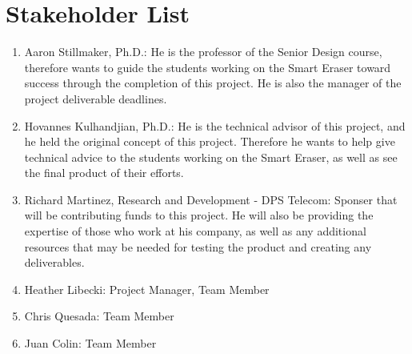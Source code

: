  \section{Stakeholder List}
 \begin{enumerate}
 	\item	Aaron Stillmaker, Ph.D.: He is the professor of the Senior Design course, therefore wants to guide the students working on the Smart Eraser toward success through the completion of this project. He is also the manager of the project deliverable deadlines.\\ 
 	\item   Hovannes Kulhandjian, Ph.D.: He is the technical advisor of this project, and he held the original concept of this project. Therefore he wants to help give technical advice to the students working on the Smart Eraser, as well as see the final product of their efforts.\\
 	\item	Richard Martinez, Research and Development - DPS Telecom: Sponser that will be contributing funds to this project. He will also be providing the expertise of those who work at his company, as well as any additional resources that may be needed for testing the product and creating any deliverables.\\
 	\item	Heather Libecki: Project Manager, Team Member\\
 	\item	Chris Quesada: Team Member\\
	\item 	Juan Colin: Team Member\\
 	 	
 \end{enumerate}
 
